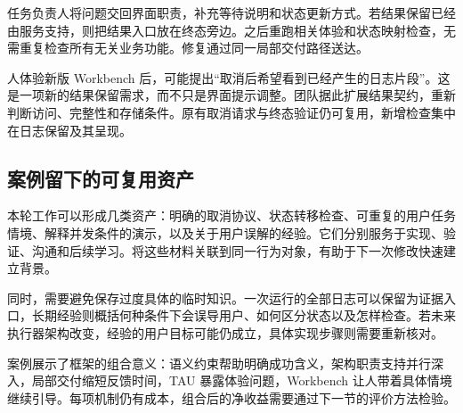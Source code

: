 任务负责人将问题交回界面职责，补充等待说明和状态更新方式。若结果保留已经由服务支持，则把结果入口放在终态旁边。之后重跑相关体验和状态映射检查，无需重复检查所有无关业务功能。修复通过同一局部交付路径送达。


人体验新版 Workbench 后，可能提出“取消后希望看到已经产生的日志片段”。这是一项新的结果保留需求，而不只是界面提示调整。团队据此扩展结果契约，重新判断访问、完整性和存储条件。原有取消请求与终态验证仍可复用，新增检查集中在日志保留及其呈现。

\subsection{案例留下的可复用资产}
本轮工作可以形成几类资产：明确的取消协议、状态转移检查、可重复的用户任务情境、解释并发条件的演示，以及关于用户误解的经验。它们分别服务于实现、验证、沟通和后续学习。将这些材料关联到同一行为对象，有助于下一次修改快速建立背景。

同时，需要避免保存过度具体的临时知识。一次运行的全部日志可以保留为证据入口，长期经验则概括何种条件下会误导用户、如何区分状态以及怎样检查。若未来执行器架构改变，经验的用户目标可能仍成立，具体实现步骤则需要重新核对。

案例展示了框架的组合意义：语义约束帮助明确成功含义，架构职责支持并行深入，局部交付缩短反馈时间，TAU 暴露体验问题，Workbench 让人带着具体情境继续引导。每项机制仍有成本，组合后的净收益需要通过下一节的评价方法检验。
